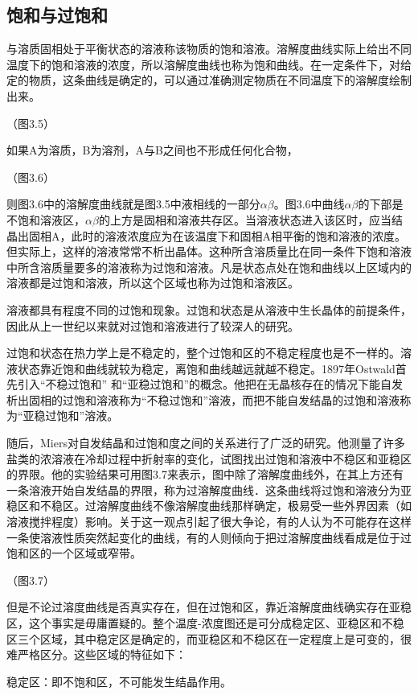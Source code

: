 ﻿\subsection{饱和与过饱和}
与溶质固相处于平衡状态的溶液称该物质的饱和溶液。溶解度曲线实际上给出不同温度下的饱和溶液的浓度，所以溶解度曲线也称为饱和曲线。在一定条件下，对给定的物质，这条曲线是确定的，可以通过准确测定物质在不同温度下的溶解度绘制出来。

（图3.5）

如果A为溶质，B为溶剂，A与B之间也不形成任何化合物，

（图3.6）

则图3.6中的溶解度曲线就是图3.5中液相线的一部分$\alpha\beta$。图3.6中曲线$\alpha\beta$的下部是不饱和溶液区，$\alpha\beta$的上方是固相和溶液共存区。当溶液状态进入该区时，应当结晶出固相A，此时的溶液浓度应为在该温度下和固相A相平衡的饱和溶液的浓度。但实际上，这样的溶液常常不析出晶体。这种所含溶质量比在同一条件下饱和溶液中所含溶质量要多的溶液称为过饱和溶液。凡是状态点处在饱和曲线以上区域内的溶液都是过饱和溶液，所以这个区域也称为过饱和溶液区。

溶液都具有程度不同的过饱和现象。过饱和状态是从溶液中生长晶体的前提条件，因此从上一世纪以来就对过饱和溶液进行了较深人的研究。

过饱和状态在热力学上是不稳定的，整个过饱和区的不稳定程度也是不一样的。溶液状态靠近饱和曲线就较为稳定，离饱和曲线越远就越不稳定。1897年Ostwald首先引入“不稳过饱和” 和“亚稳过饱和”的概念。他把在无晶核存在的情况下能自发析出固相的过饱和溶液称为“不稳过饱和”溶液，而把不能自发结晶的过饱和溶液称为“亚稳过饱和”溶液。

随后，Miers对自发结晶和过饱和度之间的关系进行了广泛的研究。他测量了许多盐类的浓溶液在冷却过程中折射率的变化，试图找出过饱和溶液中不稳区和亚稳区的界限。他的实验结果可用图3.7来表示，图中除了溶解度曲线外，在其上方还有一条溶液开始自发结晶的界限，称为过溶解度曲线．这条曲线将过饱和溶液分为亚稳区和不稳区。过溶解度曲线不像溶解度曲线那样确定，极易受一些外界因素（如溶液搅拌程度）影响。关于这一观点引起了很大争论，有的人认为不可能存在这样一条使溶液性质突然起变化的曲线，有的人则倾向于把过溶解度曲线看成是位于过饱和区的一个区域或窄带。

（图3.7）

但是不论过溶度曲线是否真实存在，但在过饱和区，靠近溶解度曲线确实存在亚稳区，这个事实是毋庸置疑的。整个温度-浓度图还是可分成稳定区、亚稳区和不稳区三个区域，其中稳定区是确定的，而亚稳区和不稳区在一定程度上是可变的，很难严格区分。这些区域的特征如下：

稳定区：即不饱和区，不可能发生结晶作用。

